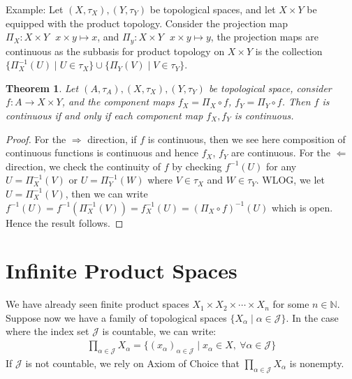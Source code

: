 \documentclass[11pt]{book}
\theoremstyle{break}
\theoremstyle{break}
\newtheorem{thm}{Theorem}[section]
\newcommand{\N}{\mathbb{N}}
\newcommand{\example}{\color{green}Example: \color{black}}
\begin{document}
\example Let $(X,\tau_X), (Y,\tau_Y)$ be topological spaces, and let $X\times Y$ be equipped with the product topology. Consider the projection map $\Pi_X:X\times Y \ \ \ x\times y\mapsto x$, and $\Pi_y : X\times Y \ \ \ x\times y \mapsto y$, the projection maps are continuous as the subbasis for product topology on $X\times Y$ is the collection $\{\Pi_{X}^{-1}(U)\mid U \in \tau_X \} \cup \{\Pi_{Y}(V)\mid  V\in \tau_Y\}$.\\

\begin{thm}
Let $(A,\tau_A), (X,\tau_X), (Y,\tau_Y)$ be topological space, consider $f:A \to X\times Y$, and the component maps $f_X = \Pi_X \circ f$, $f_Y = \Pi_Y \circ f$. Then $f$ is continuous if and only if each component map $f_X,f_Y$ is continuous. 
\end{thm}
\begin{proof}
For the $\Rightarrow$ direction, if $f$ is continuous, then we see here composition of continuous functions is continuous and hence $f_X$, $f_Y$ are continuous. For the $\Leftarrow$ direction, we check the continuity of $f$ by checking $f^{-1}(U)$ for any $U = \Pi_X^{-1}(V)$ or $U = \Pi^{-1}_Y(W)$ where $V\in\tau_X$ and $W \in \tau_Y$. WLOG, we let $U = \Pi_X^{-1}(V)$, then we can write $f^{-1}(U) = f^{-1}(\Pi_X^{-1}(V)) =f_X^{-1}(U) =(\Pi_X \circ f)^{-1}(U)$ which is open. Hence the result follows. 
\end{proof}

\newpage
\section[Infinite Product Spaces]{\color{red} Infinite Product Spaces\color{black}}
We have already seen finite product spaces $X_1\times X_2 \times \cdots\times X_n$ for some $n\in \N$. Suppose now we have a family of topological spaces $\{X_\alpha \mid \alpha\in \mathcal{J}\}$. In the case where the index set $\mathcal{J}$ is countable, we can write:
\begin{align*}
\prod_{\alpha \in \mathcal{J}}X_\alpha = \{(x_\alpha)_{\alpha \in\mathcal{J}} \mid x_\alpha \in X,\ \forall \alpha \in \mathcal{J}\}
\end{align*}
If $\mathcal{J}$ is not countable, we rely on Axiom of Choice that $\prod_{\alpha \in \mathcal{J}}X_\alpha$ is nonempty.\\
\end{document}
